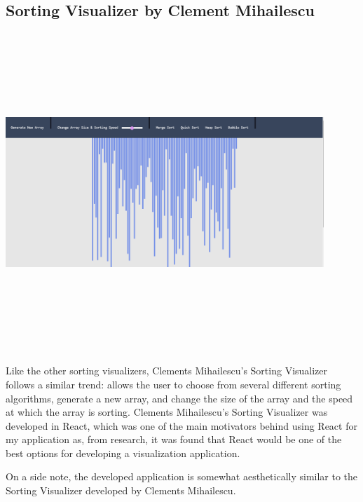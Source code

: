 \subsection{Sorting Visualizer by Clement Mihailescu}
\begin{center}
    \includegraphics[width=12cm,height=12cm,keepaspectratio]{images/sortvisclement}
\end{center}
Like the other sorting visualizers, Clements Mihailescu's Sorting Visualizer \cite{sorting_1} follows a similar trend: allows the user to choose from several different sorting algorithms, generate a new array, and change the size of the array and the speed at which the array is sorting. Clements Mihailescu's Sorting Visualizer was developed in React, which was one of the main motivators behind using React for my application as, from research, it was found that React would be one of the best options for developing a visualization application.
\par
\bigskip
On a side note, the developed application is somewhat aesthetically similar to the Sorting Visualizer developed by Clements Mihailescu.

